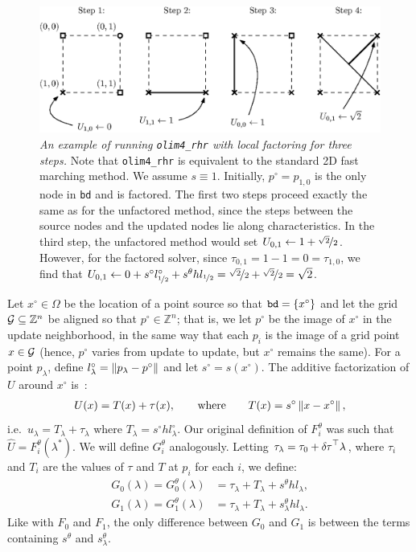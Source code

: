 \documentclass[smallcondensed]{svjour3}
\begin{document}
\begin{figure}
  \centering
  \includegraphics[width=\linewidth]{factoring-example.eps}
  \caption{\emph{An example of running \texttt{olim4\_rhr} with local
      factoring for three steps.} Note that \texttt{olim4\_rhr} is
    equivalent to the standard 2D fast marching method. We assume
    $s \equiv 1$. Initially, $p^\circ = p_{1, 0}$ is the only node in
    \texttt{bd} and is factored. The first two steps proceed exactly
    the same as for the unfactored method, since the steps between the
    source nodes and the updated nodes lie along characteristics. In
    the third step, the unfactored method would set
    $U_{0,1} \gets 1 + \nicefrac{\sqrt{2}}{2}$. However, for the
    factored solver, since $\tau_{0,1} = 1 - 1 = 0 = \tau_{1,0}$, we
    find that
    $U_{0,1} \gets 0 + s^\circ l^\circ_{\nicefrac{1}{2}} + s^\theta h
    l_{\nicefrac{1}{2}} = \nicefrac{\sqrt{2}}{2} +
    \nicefrac{\sqrt{2}}{2} = \sqrt{2}$.}\label{fig:factoring-example}
\end{figure}

Let $x^\circ \in \Omega$ be the location of a point source so that
$\texttt{bd} = \left\{x^\circ\right\}$ and let the grid
$\mathcal{G} \subseteq \mathbb{Z}^n$ be aligned so that
$p^\circ \in \mathbb{Z}^n$; that is, we let $p^\circ$ be the image of
$x^\circ$ in the update neighborhood, in the same way that each $p_i$
is the image of a grid point $x \in \mathcal{G}$ (hence, $p^\circ$ varies
from update to update, but $x^\circ$ remains the same). For a point
$p_\lambda$, define $l^\circ_\lambda = \left\|p_\lambda - p^\circ\right\|$ and
let $s^\circ = s(x^\circ)$. The additive factorization of $U$ around
$x^\circ$ is~\cite{luo2012fast,qi2018corner}:
\begin{align}
  U(x) = T(x) + \tau(x), \qquad \text{where} \qquad T(x) = s^\circ \left\|x - x^\circ\right\|,
\end{align}
i.e.\ $u_\lambda = T_\lambda + \tau_\lambda$ where
$T_\lambda = s^\circ h l^\circ_\lambda$. Our original definition of
$F_i^\theta$ was such that $\hat{U} = F_i^\theta(\lambda^*)$. We will
define $G_i^\theta$ analogously. Letting
$\tau_\lambda = \tau_0 + {\delta \hspace{-0.05em} \tau}^\top \lambda$, where $\tau_i$ and
$T_i$ are the values of $\tau$ and $T$ at $p_i$ for each $i$, we
define:
\begin{align}
  \label{eq:Gi}
  G_0(\lambda) = G_0^\theta(\lambda) &= \tau_\lambda + T_\lambda + s^\theta h l_\lambda, \\
  G_1(\lambda) = G_1^\theta(\lambda) &= \tau_\lambda + T_\lambda + s^\theta_\lambda h l_\lambda.
\end{align}
Like with $F_0$ and $F_1$, the only difference between
$G_0$ and $G_1$ is between the terms containing
$s^\theta$ and $s^\theta_\lambda$.
\end{document}
